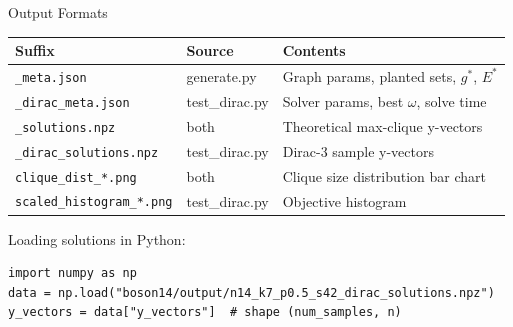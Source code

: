 \documentclass[aspectratio=169]{beamer}
\begin{document}

\begin{frame}[fragile]{Output Formats}
    \begin{tabular}{@{}lll@{}}
        \toprule
        \textbf{Suffix} & \textbf{Source} & \textbf{Contents} \\
        \midrule
        \texttt{\_meta.json}           & generate.py   & Graph params, planted sets, $g^*$, $E^*$ \\
        \texttt{\_dirac\_meta.json}    & test\_dirac.py & Solver params, best $\omega$, solve time \\
        \texttt{\_solutions.npz}       & both          & Theoretical max-clique y-vectors \\
        \texttt{\_dirac\_solutions.npz}& test\_dirac.py & Dirac-3 sample y-vectors \\
        \texttt{clique\_dist\_*.png}   & both          & Clique size distribution bar chart \\
        \texttt{scaled\_histogram\_*.png} & test\_dirac.py & Objective histogram \\
        \bottomrule
    \end{tabular}

    \vspace{0.8em}
    Loading solutions in Python:
\begin{lstlisting}[basicstyle=\ttfamily\scriptsize]
import numpy as np
data = np.load("boson14/output/n14_k7_p0.5_s42_dirac_solutions.npz")
y_vectors = data["y_vectors"]  # shape (num_samples, n)
\end{lstlisting}
\end{frame}

\end{document}
